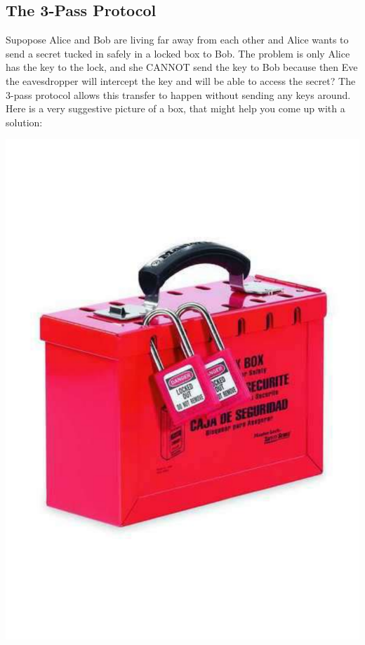 \documentclass[12pt]{article}
\theoremstyle{plain}
\theoremstyle{definition}
\theoremstyle{remark}
\begin{document}
\subsection{The 3-Pass Protocol}
Supopose Alice and Bob are living far away from each other and Alice wants to send a secret tucked in safely in a locked box to Bob. The problem is only Alice has the key to the lock, and she CANNOT send the key to Bob because then Eve the eavesdropper will intercept the key and will be able to access the secret? The 3-pass protocol allows this transfer to happen without sending any keys around. Here is a very suggestive picture of a box, that might help you come up with a solution:

\bigskip
\noindent
\begin{center}
    \includegraphics[scale=.35]{Z10BLufo5oy.pdf}
\end{center}
\end{document}
